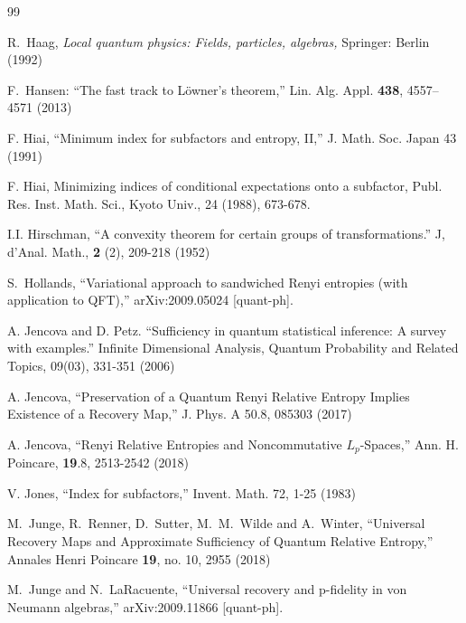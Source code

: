 \documentclass[english,a4paper,12pt]{article}
\begin{document}
\begin{thebibliography}{99}
  
  R.~Haag,
  {\it Local quantum physics: Fields, particles, algebras,}
  Springer: Berlin (1992)
  
  
  F.~Hansen: ``The fast track to L{\"o}wner's theorem,''
 Lin. Alg. Appl. {\bf 438}, 4557--4571 (2013)
 
  F. Hiai, ``Minimum index for subfactors and entropy, II,'' J. Math. Soc. Japan 43 (1991)
 
 F. Hiai, Minimizing indices of conditional expectations onto a subfactor, Publ.
Res. Inst. Math. Sci., Kyoto Univ., 24 (1988), 673-678.
  
  I.I. Hirschman, ``A convexity theorem for certain groups of transformations.'' J, d'Anal. Math., {\bf 2} (2), 209-218 (1952)
  
  S.~Hollands,
  ``Variational approach to sandwiched Renyi entropies (with application to QFT),''
  arXiv:2009.05024 [quant-ph].
  
  A. Jencova and D. Petz. ``Sufficiency in quantum statistical inference: A survey with examples.'' Infinite Dimensional Analysis, Quantum Probability and Related Topics, 
  09(03), 331-351 (2006)

A. Jencova, ``Preservation of a Quantum Renyi Relative Entropy Implies Existence of a Recovery Map,'' J. Phys. A 50.8, 085303 (2017)

A. Jencova, ``Renyi Relative Entropies and Noncommutative $L_p$-Spaces,'' Ann. H. Poincare, {\bf 19}.8, 2513-2542 (2018)
  
V. Jones, ``Index for subfactors,'' Invent. Math. 72, 1-25 (1983) 
  
   M.~Junge, R.~Renner, D.~Sutter, M.~M.~Wilde and A.~Winter,
  ``Universal Recovery Maps and Approximate Sufficiency of Quantum Relative Entropy,''
  Annales Henri Poincare {\bf 19}, no. 10, 2955 (2018)
  
M.~Junge and N.~LaRacuente,
``Universal recovery and p-fidelity in von Neumann algebras,''
arXiv:2009.11866 [quant-ph].



\end{thebibliography}
\end{document}
